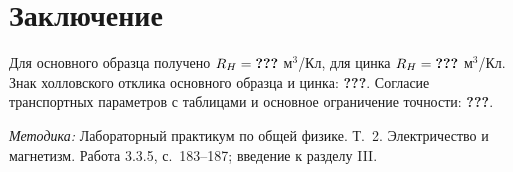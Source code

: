 \documentclass[a4paper,12pt]{article}
\makeatletter
\newcommand{\qq}{\textbf{???}}
\newcommand{\res}[1]{\ifcsname res@#1\endcsname\csname res@#1\endcsname\else\qq\fi}
\newcommand{\mainmetal}{\ifcsname res@primary\endcsname\csname res@primary\endcsname\else Cu\fi}
\makeatother
\begin{document}
\section{Заключение}
Для основного образца получено $R_H=\res{\mainmetal RH}$ м$^3$/Кл, для цинка $R_H=\res{ZnRH}$ м$^3$/Кл. Знак холловского отклика основного образца и цинка: \qq. Согласие транспортных параметров с таблицами и основное ограничение точности: \qq.

\smallskip\noindent\textit{Методика:} Лабораторный практикум по общей физике. Т.~2. Электричество и магнетизм. Работа 3.3.5, с.~183--187; введение к разделу III.
\end{document}
